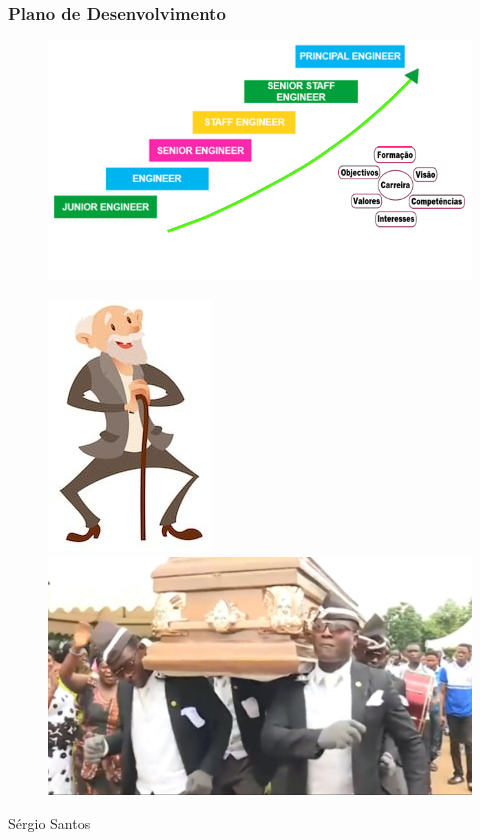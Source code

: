 \begin{frame}
\frametitle{Plano de Desenvolvimento}
\begin{minipage}{.50\textwidth}
	\begin{figure}[ht]
		\begin{flushleft}
			\includegraphics[scale=0.35]{./image/Career_Path/Progressao.png}
		\end{flushleft}
	\end{figure}
\end{minipage}
\begin{minipage}{.45\textwidth}
	\begin{figure}[ht]
		\begin{flushleft}
			\includegraphics[scale=0.25]{./image/Career_Path/Old_Age.jpeg}
		\end{flushleft}
		\begin{flushright}
			\includegraphics[scale=0.1]{./image/Career_Path/Burial.jpeg}
		\end{flushright}
	\end{figure}
\end{minipage}
\vfill \hfill {\tiny Sérgio Santos}
\end{frame}

